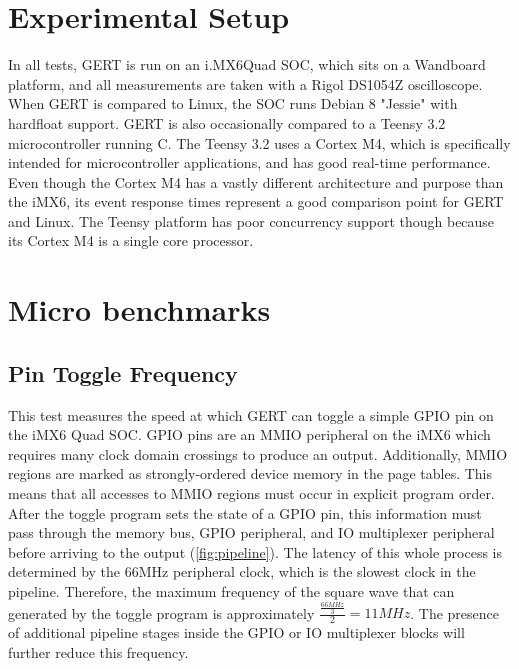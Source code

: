 \section{Experimental Setup} \label{sec:setup}
In all tests, GERT is run on an i.MX6Quad SOC, which sits on a Wandboard
platform, and all measurements are taken
with a Rigol DS1054Z oscilloscope. When GERT is compared to Linux, the SOC
runs Debian 8 "Jessie" with hardfloat support. GERT is also occasionally
compared to a Teensy 3.2 microcontroller running C. The Teensy 3.2 \cite{teensy} uses a Cortex M4, which is specifically
intended for microcontroller applications, and has good real-time performance. Even though
the Cortex M4 has a vastly different architecture and purpose than the iMX6, its event
response times represent a good comparison point for GERT and Linux.
The Teensy platform
has poor concurrency support though because its Cortex M4 is a single core processor.



\section{Micro benchmarks}

\subsection{Pin Toggle Frequency}\label{sec:pin_toggle}
This test measures the speed at which GERT can toggle a simple GPIO pin on
the iMX6 Quad SOC. GPIO pins are an MMIO peripheral on the iMX6 which requires
many clock domain crossings to produce an output. Additionally, MMIO regions are marked as strongly-ordered
device memory in the page tables. This means that all accesses to MMIO regions must occur in explicit program order.
After the toggle program sets
the state of a GPIO pin, this information must pass through the memory bus,
GPIO peripheral, and IO multiplexer peripheral before arriving to the output (\ref{fig:pipeline}).
The latency of this whole process is determined by the 66MHz peripheral clock,
which is the slowest clock in the pipeline. Therefore, the maximum frequency
of the square wave that can generated by the toggle program is approximately $\frac{\frac{66MHz}{3}}{2}=11MHz$. The presence
of additional pipeline stages inside the GPIO or IO multiplexer blocks will further
reduce this frequency.

